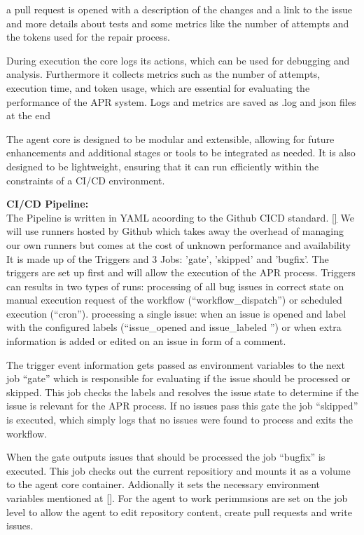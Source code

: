 a pull request is opened with a description of the changes and a link to the issue and more details about tests and some metrics like the number of attempts and the tokens used for the repair process.

During execution the core logs its actions, which can be used for debugging and analysis. Furthermore it collects metrics such as the number of attempts, execution time, and token usage, which are essential for evaluating the performance of the APR system. Logs and metrics are saved as .log and json files at the end

The agent core is designed to be modular and extensible, allowing for future enhancements and additional stages or tools to be integrated as needed. It is also designed to be lightweight, ensuring that it can run efficiently within the constraints of a CI/CD environment.



\textbf{CI/CD Pipeline:}\\
The Pipeline is written in YAML acoording to the Github CICD standard. \ref{}
We will use runners hosted by Github which takes away the overhead of managing our own runners but comes at the cost of unknown performance and availability
It is made up of the Triggers and 3 Jobs: 'gate', 'skipped' and 'bugfix'.
The triggers are set up first and will allow the execution of the APR process.
Triggers can results in two types of runs:
processing of all bug issues in correct state on manual execution request of the workflow (``workflow\_dispatch'') or scheduled execution (``cron'').
processing a single issue: when an issue is opened and label with the configured labels (``issue\_opened and issue\_labeled '') or when extra information is added or edited on an issue in form of a comment.

The trigger  event information gets passed as environment variables to the next job
``gate'' which is responsible for evaluating if the issue should be processed or skipped. This job checks the labels and resolves the issue state to determine if the issue is relevant for the APR process.
If no issues pass this gate the job ``skipped'' is executed, which simply logs that no issues were found to process and exits the workflow.

When the gate outputs issues that should be processed the job ``bugfix'' is executed. This job checks out the current repositiory and mounts it as a volume to the agent core container. Addionally it sets the necessary environment variables mentioned at \ref{}. For the agent to work perimmsions are set on the job level to allow the agent to edit repository content, create pull requests and write issues.

